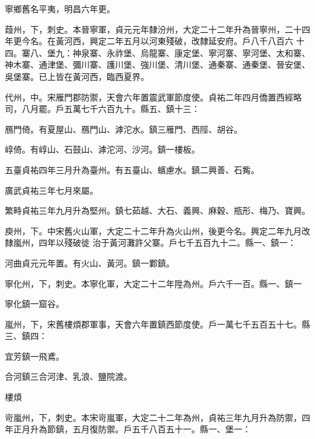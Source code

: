 \begin{pinyinscope}
 寧鄉舊名平夷，明昌六年更。



 葭州，下，刺史。本晉寧軍，貞元元年隸汾州，大定二十二年升為晉寧州，二十四年更今名。在黃河西，興定二年五月以河東殘破，改隸延安府。戶八千八百六
 十四。寨八、堡九：神泉寨、永祚堡、烏龍寨、康定堡、寧河寨、寧河堡、太和寨、神木寨、通津堡、彌川寨、護川堡、強川堡、清川堡、通秦寨、通秦堡、晉安堡、吳堡寨。已上皆在黃河西，臨西夏界。



 代州，中。宋雁門郡防禦，天會六年置震武軍節度使。貞祐二年四月僑置西經略司，八月罷。戶五萬七千六百九十。縣五、鎮十三：



 鴈門倚。有夏屋山、鴈門山、滹沱水。鎮三雁門、西陘、胡谷。



 崞倚。有崞山、石鼓山、滹沱河、沙河。鎮一樓板。



 五臺貞祐四年三月升為臺州。有五臺山、蠙慮水。鎮二興善、石觜。



 廣武貞祐三年七月來屬。



 繁畤貞祐三年九月升為堅州。鎮七茹越、大石、義興、麻穀、瓶形、梅乃、寶興。



 庾州，下。中宋舊火山軍，大定二十二年升為火山州，後更今名。興定二年九月改隸嵐州，四年以殘破徙
 治于黃河灘許父寨。戶七千五百九十二。縣一、鎮一：



 河曲貞元元年置。有火山、黃河。鎮一鄴鎮。



 寧化州，下，刺史。本寧化軍，大定二十二年陞為州。戶六千一百。縣一、鎮一



 寧化鎮一窟谷。



 嵐州，下，宋舊樓煩郡軍事，天會六年置鎮西節度使。戶一萬七千五百五十七。縣三、鎮四：



 宜芳鎮一飛鳶。



 合河鎮三合河津、乳浪、鹽院渡。



 樓煩



 岢嵐州，下，刺史。本宋岢嵐軍，大定二十二年為州，貞祐三年九月升為防禦，四年正月升為節鎮，五月復防禦。戶五千八百五十一。縣一、堡一：




\end{pinyinscope}
